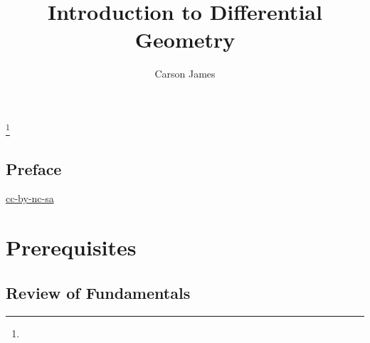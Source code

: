 \documentclass{book}
\begin{document}
	
	\frontmatter
	
	\title{Introduction to Differential Geometry}
	
	
	\author{Carson James}
	\thanks{}
	
	\date{}
	
	\maketitle
	
	
\setcounter{page}{4}
	
\tableofcontents
\printunsrtglossary[type=symbols,style=long,title={Notation}]
	
%
	
\mainmatter
%
	
\chapter*{Preface}
	
\begin{flushleft}
	\href{https://creativecommons.org/licenses/by-nc-sa/4.0/legalcode.txt}{cc-by-nc-sa}
\end{flushleft}
	








	\part{Prerequisites}
	
	\chapter{Review of Fundamentals}
\end{document}

